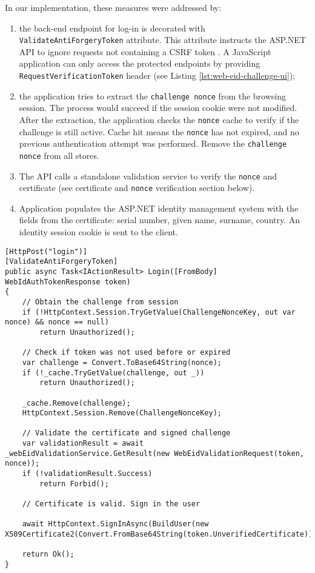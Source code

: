 In our implementation, these measures were addressed by:
\begin{enumerate}
  \item the back-end endpoint for log-in is decorated with \texttt{ValidateAntiForgeryToken} attribute. This attribute instructs the ASP.NET API to ignore requests not containing a CSRF token \cite{msdocs-anti-request-forgery}. A JavaScript application can only access the protected endpoints by providing \texttt{RequestVerificationToken} header (see Listing \ref{lst:web-eid-challenge-ui});
  \item the application tries to extract the \texttt{challenge nonce} from the browsing session. The process would succeed if the session cookie were not modified. After the extraction, the application checks the \texttt{nonce} cache to verify if the challenge is still active. Cache hit means the \texttt{nonce} has not expired, and no previous authentication attempt was performed. Remove the \texttt{challenge nonce} from all stores.
  \item The API calls a standalone validation service to verify the \texttt{nonce} and certificate (see certificate and \texttt{nonce} verification section below).
  \item Application populates the ASP.NET identity management system with the fields from the certificate: serial number, given name, surname, country. An identity session cookie is sent to the client.
\end{enumerate}

\begin{lstlisting}[caption={Web eID Login Endpoint}, label={lst:web-eid-login}]
[HttpPost("login")]
[ValidateAntiForgeryToken]
public async Task<IActionResult> Login([FromBody] WebIdAuthTokenResponse token)
{
    // Obtain the challenge from session
    if (!HttpContext.Session.TryGetValue(ChallengeNonceKey, out var nonce) && nonce == null)
        return Unauthorized();

    // Check if token was not used before or expired
    var challenge = Convert.ToBase64String(nonce);
    if (!_cache.TryGetValue(challenge, out _))
        return Unauthorized();

    _cache.Remove(challenge);
    HttpContext.Session.Remove(ChallengeNonceKey);

    // Validate the certificate and signed challenge
    var validationResult = await _webEidValidationService.GetResult(new WebEidValidationRequest(token, nonce));
    if (!validationResult.Success)
        return Forbid();

    // Certificate is valid. Sign in the user

    await HttpContext.SignInAsync(BuildUser(new X509Certificate2(Convert.FromBase64String(token.UnverifiedCertificate)).Subject));

    return Ok();
}
\end{lstlisting}

